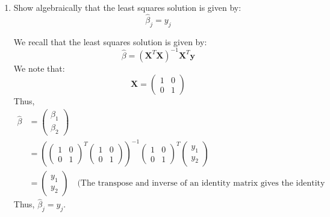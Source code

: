 \documentclass[11pt,twoside]{article}
\newcommand{\pts}[1]{\marginpar{ \small\hspace{0pt} \textit{[#1]} } }
\newcommand{\lt}{\left}
\newcommand{\rt}{\right}
\newcommand{\?}{\stackrel{?}{=}}
\newcommand{\bl}{\color{blue!80!black}}
\newenvironment{solution}
{\medskip\par\begin{adjustwidth}{.01\textwidth}{.01\textwidth}\bl}{\medskip\end{adjustwidth}}
\begin{document}
\begin{enumerate}[\bf (a)]
\item Show algebraically  that the least squares solution is given by: \pts{3}
  \begin{equation}
    \label{eq:1}
    \hat\beta_{j} = y_{j}
  \end{equation}

    \begin{solution}
    We recall that the least squares solution is given by:
    \begin{equation*}
      \hat\beta = (\bm X^T\bm X)^{-1}\bm X^T\bm y
    \end{equation*}
    We note that:
    \begin{equation*}
      \bm X =
      \begin{pmatrix}
        1 & 0 \\ 0 & 1
      \end{pmatrix}
    \end{equation*}
    Thus,
    \begin{align*}
      \hat\beta &=
                  \begin{pmatrix}
                    \beta_1 \\ \beta_2
                  \end{pmatrix} \\
                &=
\lt(
                  \begin{pmatrix}
                    1 &0 \\ 0 &1
                  \end{pmatrix}^T
                                \begin{pmatrix}
                                  1 &0 \\ 0 &1                                  
                                \end{pmatrix}\rt)^{-1} 
                                              \begin{pmatrix}
                                                1 &0 \\ 0 &1
                                              \end{pmatrix}^T
                                                            \begin{pmatrix}
                                                              y_1 \\ y_2
                                                            \end{pmatrix}\\
                &=
                  \begin{pmatrix}
                    y_1 \\ y_2
                  \end{pmatrix} \quad \text{(The transpose and inverse of an identity matrix gives the identity matrix)}
    \end{align*}
    Thus, $\hat \beta_j = y_j$.
  \end{solution}
  

\end{enumerate}
\end{document}
